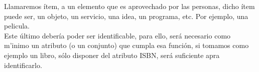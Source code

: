 Llamaremos ítem, a un elemento que es aprovechado por las personas, dicho ítem puede ser, un objeto, un servicio, una idea, un programa, etc.  Por ejemplo, una pelicula.\\
Este último debería poder ser identificable, para ello, será necesario como m'inimo un atributo (o un conjunto) que cumpla esa función,  si tomamos como ejemplo un libro, sólo disponer del atributo ISBN, será suficiente apra identificarlo.\\
